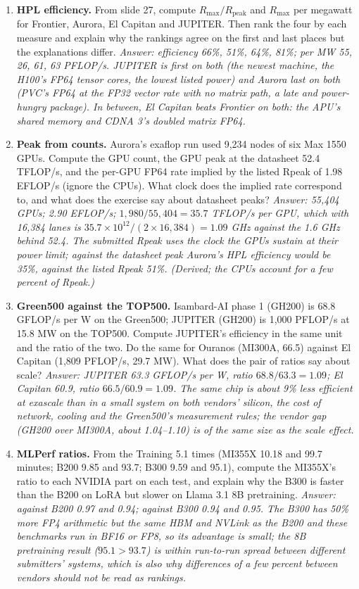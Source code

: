 \documentclass[11pt,letterpaper]{article}
\begin{document}
\begin{enumerate}[leftmargin=1.6em,itemsep=6pt]
\item \textbf{HPL efficiency.} From slide 27, compute $R_{\max}/R_{\text{peak}}$ and $R_{\max}$ per megawatt for Frontier, Aurora, El Capitan and JUPITER. Then rank the four by each measure and explain why the rankings agree on the first and last places but the explanations differ. \emph{Answer: efficiency 66\%, 51\%, 64\%, 81\%; per MW 55, 26, 61, 63 PFLOP/s. JUPITER is first on both (the newest machine, the H100's FP64 tensor cores, the lowest listed power) and Aurora last on both (PVC's FP64 at the FP32 vector rate with no matrix path, a late and power-hungry package). In between, El Capitan beats Frontier on both: the APU's shared memory and CDNA 3's doubled matrix FP64.}
\item \textbf{Peak from counts.} Aurora's exaflop run used 9,234 nodes of six Max 1550 GPUs. Compute the GPU count, the GPU peak at the datasheet 52.4 TFLOP/s, and the per-GPU FP64 rate implied by the listed Rpeak of 1.98 EFLOP/s (ignore the CPUs). What clock does the implied rate correspond to, and what does the exercise say about datasheet peaks? \emph{Answer: 55,404 GPUs; 2.90 EFLOP/s; $1{,}980/55{,}404 = 35.7$ TFLOP/s per GPU, which with 16,384 lanes is $35.7\times 10^{12}/(2\times 16{,}384) = 1.09$ GHz against the 1.6 GHz behind 52.4. The submitted Rpeak uses the clock the GPUs sustain at their power limit; against the datasheet peak Aurora's HPL efficiency would be 35\%, against the listed Rpeak 51\%. (Derived; the CPUs account for a few percent of Rpeak.)}
\item \textbf{Green500 against the TOP500.} Isambard-AI phase 1 (GH200) is 68.8 GFLOP/s per W on the Green500; JUPITER (GH200) is 1,000 PFLOP/s at 15.8 MW on the TOP500. Compute JUPITER's efficiency in the same unit and the ratio of the two. Do the same for Ouranos (MI300A, 66.5) against El Capitan (1,809 PFLOP/s, 29.7 MW). What does the pair of ratios say about scale? \emph{Answer: JUPITER 63.3 GFLOP/s per W, ratio $68.8/63.3 = 1.09$; El Capitan 60.9, ratio $66.5/60.9 = 1.09$. The same chip is about 9\% less efficient at exascale than in a small system on both vendors' silicon, the cost of network, cooling and the Green500's measurement rules; the vendor gap (GH200 over MI300A, about 1.04--1.10) is of the same size as the scale effect.}
\item \textbf{MLPerf ratios.} From the Training 5.1 times (MI355X 10.18 and 99.7 minutes; B200 9.85 and 93.7; B300 9.59 and 95.1), compute the MI355X's ratio to each NVIDIA part on each test, and explain why the B300 is faster than the B200 on LoRA but slower on Llama 3.1 8B pretraining. \emph{Answer: against B200 0.97 and 0.94; against B300 0.94 and 0.95. The B300 has 50\% more FP4 arithmetic but the same HBM and NVLink as the B200 and these benchmarks run in BF16 or FP8, so its advantage is small; the 8B pretraining result ($95.1 > 93.7$) is within run-to-run spread between different submitters' systems, which is also why differences of a few percent between vendors should not be read as rankings.}

\end{enumerate}
\end{document}

